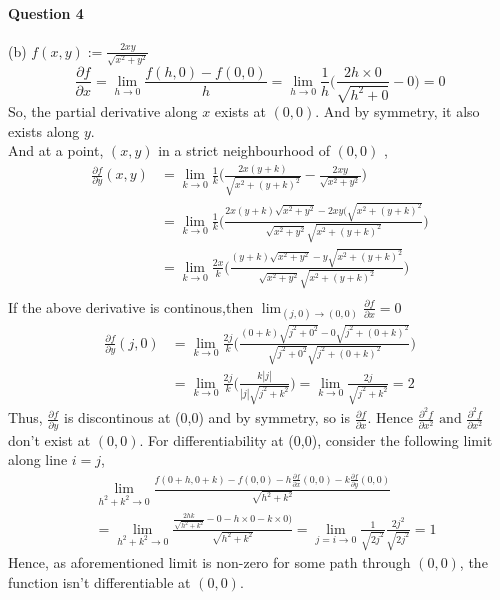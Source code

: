 \documentclass[20pt,a4paper]{extarticle} %
\theoremstyle{definition}
\theoremstyle{definition}
\begin{document}
\paragraph{Question 4}
(b) $f(x,y):= \frac{2xy}{\sqrt{x^2+y^2}}$ \\
\[ \frac{\partial f}{\partial x}=\lim_{h \to 0} \frac{f(h,0)-f(0,0)}{h}=
\lim_{h \to 0} \frac{1}{h} \big( \frac{2h \times 0}{\sqrt{h^2+0}} - 0 \big)=0\]
So, the partial derivative along $x$ exists at $(0,0)$. And by symmetry, it also exists along $y$.\\
And at a point, $(x,y)$ in a strict neighbourhood of $(0,0)$ ,
\begin{align*}
	\frac{\partial f}{\partial y}(x,y)&=\lim_{k \to 0} \frac{1}{k} \Big(
	\frac{2x(y+k)}{\sqrt{x^2+(y+k)^2}}- \frac{2xy}{\sqrt{x^2+y^2}}  \Big) \\
					  & =\lim_{k \to 0} \frac{1}{k} \Big(
						  \frac{2x(y+k) \sqrt{x^2+y^2} - 2xy(\sqrt{x^2+(y+k)^2}}
						  {\sqrt{x^2+y^2}\sqrt{x^2+(y+k)^2}} \Big) \\
					  & =\lim_{k \to 0} \frac{2x}{k} \Big(
						  \frac{(y+k)\sqrt{x^2+y^2} - y\sqrt{x^2+(y+k)^2}}
						  {\sqrt{x^2+y^2}\sqrt{x^2+(y+k)^2}} \Big)\\
\end{align*}
If the above derivative is continous,then $ \lim_{(j,0) \to (0,0)}\frac{\partial f}{\partial x} = 0$ \\
\begin{align*}
	\label{eq:}
\frac{\partial f}{\partial y}(j,0) 				  & =\lim_{k \to 0} \frac{2j}{k} \Big(
						  \frac{(0+k)\sqrt{j^2+0^2} - 0\sqrt{j^2+(0+k)^2}}
						  {\sqrt{j^2+0^2}\sqrt{j^2+(0+k)^2}} \Big) \\
						  & =\lim_{k \to 0} \frac{2j}{k} \Big(
							  \frac{k|j|}{|j|\sqrt{j^2+k^2}} \Big)
							  =\lim_{k \to 0} \frac{2j}{\sqrt{j^2+k^2}}=2
\end{align*}
Thus, $\frac{\partial f}{\partial y}$ is discontinous at (0,0) and by symmetry, so is
$\frac{\partial f}{\partial x}$. \newpage
Hence $\frac{\partial^2 f}{\partial x^2} \text{ and }
\frac{\partial^2 f}{\partial x^2}$ don't exist at $(0,0)$.
For differentiability at (0,0), consider the following limit along line $i=j$,
\begin{align*}
&\lim_{h^2+k^2 \to 0} \frac{f(0+h,0+k)- f(0,0)-h\frac{\partial f}{\partial x}(0,0)
-k\frac{\partial f}{\partial y}(0,0)}{\sqrt{h^2+k^2 }} \\
&=\lim_{h^2+k^2 \to 0} \frac{\frac{2hk}{\sqrt{h^2+k^2}}- 0-h\times 0-k \times 0)}{\sqrt{h^2+k^2 }}
=\lim_{j=i \to 0} \frac{1}{\sqrt{2j^2}} \frac{2j^2}{\sqrt{2j^2}}=1
\end{align*}
Hence, as aforementioned limit is non-zero for some path through $(0,0)$, the function isn't
differentiable at $(0,0)$. \\
\end{document}
